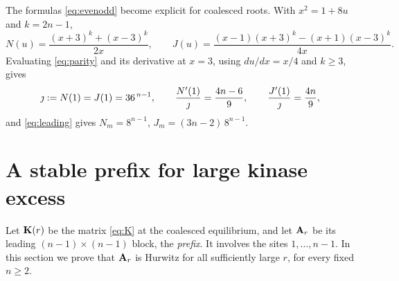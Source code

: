 The formulas \eqref{eq:evenodd} become explicit for coalesced roots. With \(x^2=1+8u\) and
\(k=2n-1\),
\begin{equation}\label{eq:parity}
 N(u)=\frac{(x+3)^k+(x-3)^k}{2x},\qquad
 J(u)=\frac{(x-1)(x+3)^k-(x+1)(x-3)^k}{4x}.
\end{equation}
Evaluating \eqref{eq:parity} and its derivative at \(x=3\), using \(du/dx=x/4\) and \(k\ge3\),
gives
\begin{equation}\label{eq:moments}
 \jmath:=N(1)=J(1)=36^{\,n-1},\qquad
 \frac{N'(1)}{\jmath}=\frac{4n-6}{9},\qquad \frac{J'(1)}{\jmath}=\frac{4n}{9},
\end{equation}
and \eqref{eq:leading} gives \(N_m=8^{n-1}\), \(J_m=(3n-2)\,8^{n-1}\).

\section{A stable prefix for large kinase excess}\label{sec:prefix}
Let \(\mathbf K(r)\) be the matrix \eqref{eq:K} at the coalesced equilibrium, and let \(\mathbf A_r\) be its
leading \((n-1)\times(n-1)\) block, the \emph{prefix}. It involves the sites \(1,\dots,n-1\). In
this section we prove that \(\mathbf A_r\) is Hurwitz for all sufficiently large \(r\), for every
fixed \(n\ge2\).

